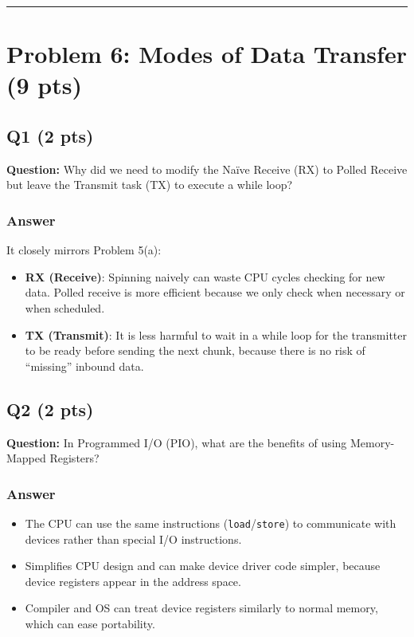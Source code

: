 \documentclass[12pt]{article}
\begin{document}
	\hrule
	\vspace{0.5cm}
	
	\section{Problem 6: Modes of Data Transfer (9 pts)}
	\subsection*{Q1 (2 pts)}
	\textbf{Question:} Why did we need to modify the Naïve Receive (RX) to Polled Receive but leave the Transmit task (TX) to execute a while loop?
	
	\subsubsection*{Answer}
	It closely mirrors Problem 5(a):
	\begin{itemize}
		\item \textbf{RX (Receive)}: Spinning naively can waste CPU cycles checking for new data. Polled receive is more efficient because we only check when necessary or when scheduled.
		\item \textbf{TX (Transmit)}: It is less harmful to wait in a while loop for the transmitter to be ready before sending the next chunk, because there is no risk of “missing” inbound data.
	\end{itemize}
	
	\subsection*{Q2 (2 pts)}
	\textbf{Question:} In Programmed I/O (PIO), what are the benefits of using Memory-Mapped Registers?
	
	\subsubsection*{Answer}
	\begin{itemize}
		\item The CPU can use the same instructions (\texttt{load}/\texttt{store}) to communicate with devices rather than special I/O instructions.
		\item Simplifies CPU design and can make device driver code simpler, because device registers appear in the address space.
		\item Compiler and OS can treat device registers similarly to normal memory, which can ease portability.
	\end{itemize}
	
\end{document}
